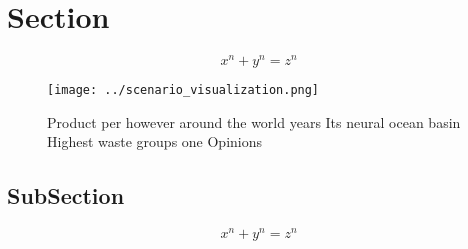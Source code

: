 \documentclass[a4paper]{article}
\begin{document}
\section{Section}

\[ x^n + y^n = z^n \]

\begin{figure}
\centering
\texttt{[image: ../scenario\_visualization.png]}
\caption{Product per however around the world years Its neural ocean basin Highest waste groups one Opinions
}
\end{figure}
 
\subsection{SubSection}

\[ x^n + y^n = z^n \]
\end{document}
